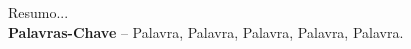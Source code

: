 Resumo...
%
\\[3\baselineskip]
%
\textbf{Palavras-Chave} -- Palavra, Palavra, Palavra, Palavra, Palavra.